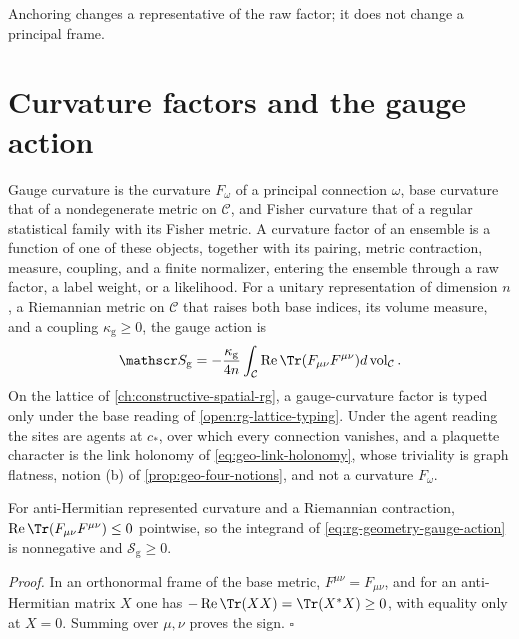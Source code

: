 Anchoring changes a representative of the raw factor; it does not change a
principal frame.

\section{Curvature factors and the gauge action}
\label{sec:rg-geometry-curvatures}

Gauge curvature is the curvature $F_\omega$ of a principal connection $\omega$,
base curvature that of a nondegenerate metric on $\mathcal C$, and Fisher
curvature that of a regular statistical family with its Fisher metric. A
curvature factor of an ensemble is a function of one of these objects,
together with its pairing, metric contraction, measure, coupling, and a
finite normalizer, entering the ensemble through a raw factor, a label
weight, or a likelihood. For a unitary representation of dimension $n$, a
Riemannian metric on $\mathcal C$ that raises both base indices, its volume
measure, and a coupling $\kappa_{\mathrm g}\geq0$, the gauge action is
\begin{equation}
 \mathscr S_{\mathrm g}=
 -\frac{\kappa_{\mathrm g}}{4n}\int_{\mathcal C}
 \operatorname{Re}\Tr(F_{\mu\nu}F^{\mu\nu})d\operatorname{vol}_{\mathcal C}.
 \label{eq:rg-geometry-gauge-action}
\end{equation}
On the lattice of \cref{ch:constructive-spatial-rg}, a gauge-curvature factor
is typed only under the base reading of \cref{open:rg-lattice-typing}. Under
the agent reading the sites are agents at $c_*$, over which every connection
vanishes, and a plaquette character is the link holonomy of
\cref{eq:geo-link-holonomy}, whose triviality is graph flatness, notion (b) of
\cref{prop:geo-four-notions}, and not a curvature $F_\omega$.

For anti-Hermitian represented curvature and a Riemannian contraction,
$\operatorname{Re}\Tr(F_{\mu\nu}F^{\mu\nu})\leq0$ pointwise, so the integrand
of \cref{eq:rg-geometry-gauge-action} is nonnegative and
$\mathscr S_{\mathrm g}\geq0$. 

\noindent\emph{Proof.}
In an orthonormal frame of the base metric, $F^{\mu\nu}=F_{\mu\nu}$, and for
an anti-Hermitian matrix $X$ one has
$-\operatorname{Re}\Tr(XX)=\Tr(X^*X)\geq0$, with equality only at $X=0$.
Summing over $\mu,\nu$ proves the sign. $\square$

